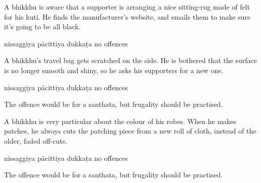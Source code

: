 \begin{exam}{\autoExamName}
\begin{problem*}
\begin{parts}
      \bigskip

      \item A bhikkhu is aware that a supporter is arranging a nice sitting-rug
      made of felt for his kuti. He finds the manufacturer's website, and emails
      them to make sure it's going to be all black.

      \bigskip

      \begin{answers}{3}
        \bChoices
         nissaggiya pācittiya\eAns
         dukkaṭa\eAns
         no offences\eAns
        \eChoices
      \end{answers}

      \bigskip

      \item A bhikkhu's travel bag gets scratched on the side. He is bothered
      that the surface is no longer smooth and shiny, so he asks his supporters
      for a new one.

      \bigskip

      \begin{answers}{3}
        \bChoices
         nissaggiya pācittiya\eAns
         dukkaṭa\eAns
         no offences\eAns
        \eChoices
      \end{answers}

      \begin{solution}
        The offence would be for a santhata, but frugality should be practised.
      \end{solution}

      \bigskip

      \item A bhikkhu is very particular about the colour of his robes. When he
      makes patches, he always cuts the patching piece from a new roll of cloth,
      instead of the older, faded off-cuts.

      \bigskip

      \begin{answers}{3}
        \bChoices
         nissaggiya pācittiya\eAns
         dukkaṭa\eAns
         no offences\eAns
        \eChoices
      \end{answers}

      \begin{solution}
        The offence would be for a santhata, but frugality should be practised.
      \end{solution}

    \end{parts}

  \end{problem*}

\end{exam}
